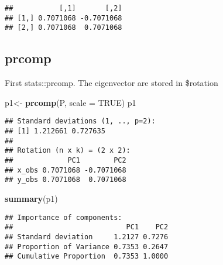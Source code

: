 \documentclass[]{article}
\newenvironment{Shaded}{\begin{snugshade}}{\end{snugshade}}
\newcommand{\KeywordTok}[1]{\textcolor[rgb]{0.13,0.29,0.53}{\textbf{#1}}}
\newcommand{\DataTypeTok}[1]{\textcolor[rgb]{0.13,0.29,0.53}{#1}}
\newcommand{\DecValTok}[1]{\textcolor[rgb]{0.00,0.00,0.81}{#1}}
\newcommand{\StringTok}[1]{\textcolor[rgb]{0.31,0.60,0.02}{#1}}
\newcommand{\CommentTok}[1]{\textcolor[rgb]{0.56,0.35,0.01}{\textit{#1}}}
\newcommand{\OtherTok}[1]{\textcolor[rgb]{0.56,0.35,0.01}{#1}}
\newcommand{\OperatorTok}[1]{\textcolor[rgb]{0.81,0.36,0.00}{\textbf{#1}}}
\newcommand{\NormalTok}[1]{#1}
\begin{document}
\begin{verbatim}
##           [,1]       [,2]
## [1,] 0.7071068 -0.7071068
## [2,] 0.7071068  0.7071068
\end{verbatim}

\hypertarget{prcomp}{%
\subsection{prcomp}\label{prcomp}}

First stats::prcomp. The eigenvector are stored in \$rotation

\begin{Shaded}
\begin{Highlighting}[]
\NormalTok{p1<-}\StringTok{ }\KeywordTok{prcomp}\NormalTok{(P, }\DataTypeTok{scale =} \OtherTok{TRUE}\NormalTok{)}
\NormalTok{p1}
\end{Highlighting}
\end{Shaded}

\begin{verbatim}
## Standard deviations (1, .., p=2):
## [1] 1.212661 0.727635
## 
## Rotation (n x k) = (2 x 2):
##             PC1        PC2
## x_obs 0.7071068 -0.7071068
## y_obs 0.7071068  0.7071068
\end{verbatim}

\begin{Shaded}
\begin{Highlighting}[]
\KeywordTok{summary}\NormalTok{(p1)}
\end{Highlighting}
\end{Shaded}

\begin{verbatim}
## Importance of components:
##                           PC1    PC2
## Standard deviation     1.2127 0.7276
## Proportion of Variance 0.7353 0.2647
## Cumulative Proportion  0.7353 1.0000
\end{verbatim}

\begin{Shaded}
\end{Shaded}
\end{document}
